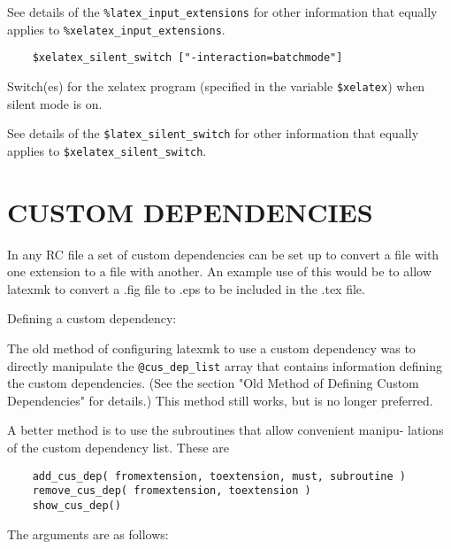 See details of the \verb|%latex_input_extensions| for other information
that equally applies to \verb|%xelatex_input_extensions|.

\begin{verbatim}
	$xelatex_silent_switch ["-interaction=batchmode"]
\end{verbatim}

Switch(es) for the xelatex program (specified  in  the  variable
\verb|$xelatex|) when silent mode is on.

See  details  of  the \verb|$latex_silent_switch| for other information
that equally applies to \verb|$xelatex_silent_switch|.

\section{CUSTOM DEPENDENCIES}

In any RC file a set of custom dependencies can be set up to convert  a file
with one extension to a file with another.  An example use of this would be to
allow latexmk to convert a .fig file to .eps to be included in the .tex file.

Defining a custom dependency:

The old method of configuring latexmk to use a custom dependency was to
directly manipulate the \verb|@cus_dep_list| array that  contains  information
defining  the  custom  dependencies.   (See  the section "Old Method of
Defining Custom Dependencies" for details.) This  method  still  works,
but is no longer preferred.

A better method is to use the subroutines that allow convenient manipu-
lations of the custom dependency list.  These are

\begin{verbatim}
	add_cus_dep( fromextension, toextension, must, subroutine )
	remove_cus_dep( fromextension, toextension )
	show_cus_dep()
\end{verbatim}

The arguments are as follows:

